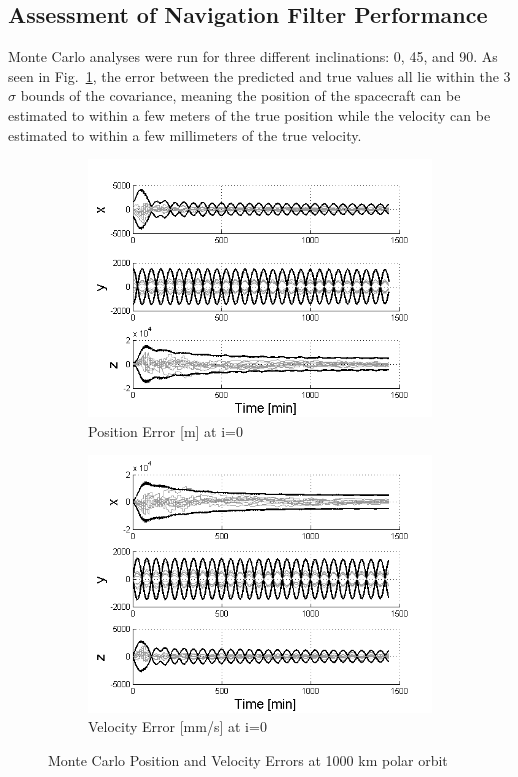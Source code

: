 \documentclass[]{aiaa-tc}%
\begin{document}
\subsection{Assessment of Navigation Filter Performance}
Monte Carlo analyses were run for three different inclinations: 0\degree, 45\degree, and 90\degree.  As seen in Fig.~\ref{fig:mcpos0}, the error between the predicted and true values all lie within the 3$\sigma$ bounds of the covariance, meaning the position of the spacecraft can be estimated to within a few meters of the true position while the velocity can be estimated to within a few millimeters of the true velocity.  
\begin{figure}[ht!]
\centering
\begin{subfigure}{.5\textwidth}
  \centering
  \includegraphics[width=0.9\linewidth]{MC_pos0}
  \caption{Position Error [m] at i=0\degree}
  \label{fig:mcpos0}
\end{subfigure}%
\begin{subfigure}{.5\textwidth} 
  \centering
  \includegraphics[width=0.9\linewidth]{MC_vel0}
  \caption{Velocity Error [mm/s] at i=0\degree}
  \label{fig:coastline}
\end{subfigure}
\caption{Monte Carlo Position and Velocity Errors at 1000 km polar orbit}
\label{fig:mcvel0}
\end{figure}
\end{document}
